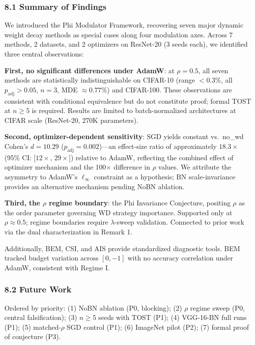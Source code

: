 \documentclass[
]{article}
\begin{document}
\hypertarget{summary-of-findings}{%
\subsubsection{8.1 Summary of Findings}\label{summary-of-findings}}

We introduced the Phi Modulator Framework, recovering seven major
dynamic weight decay methods as special cases along four modulation
axes. Across 7 methods, 2 datasets, and 2 optimizers on ResNet-20 (3
seeds each), we identified three central observations:

\textbf{First, no significant differences under AdamW}: at
\(\rho = 0.5\), all seven methods are statistically indistinguishable on
CIFAR-10 (range \(< 0.3\%\), all \(p_{\text{adj}} > 0.05\), \(n = 3\),
MDE \(\approx 0.77\%\)) and CIFAR-100. These observations are consistent
with conditional equivalence but do not constitute proof; formal TOST at
\(n \geq 5\) is required. Results are limited to batch-normalized
architectures at CIFAR scale (ResNet-20, 270K parameters).

\textbf{Second, optimizer-dependent sensitivity}: SGD yields constant
vs.~no\_wd Cohen's \(d = 10.29\) (\(p_{\text{adj}} = 0.002\))---an
effect-size ratio of approximately \(18.3\times\) (95\% CI:
{[}\(12\times\), \(29\times\){]}) relative to AdamW, reflecting the
combined effect of optimizer mechanism and the 100\(\times\) difference
in \(\rho\) values. We attribute the asymmetry to AdamW's
\(\ell_\infty\) constraint as a hypothesis; BN scale-invariance provides
an alternative mechanism pending NoBN ablation.

\textbf{Third, the \(\rho\) regime boundary}: the Phi Invariance
Conjecture, positing \(\rho\) as the order parameter governing WD
strategy importance. Supported only at \(\rho \approx 0.5\); regime
boundaries require \(\lambda\)-sweep validation. Connected to prior work
via the dual characterization in Remark 1.

Additionally, BEM, CSI, and AIS provide standardized diagnostic tools.
BEM tracked budget variation across \([0, -1]\) with no accuracy
correlation under AdamW, consistent with Regime I.

\hypertarget{future-work}{%
\subsubsection{8.2 Future Work}\label{future-work}}

Ordered by priority: (1) NoBN ablation (P0, blocking); (2) \(\rho\)
regime sweep (P0, central falsification); (3) \(n \geq 5\) seeds with
TOST (P1); (4) VGG-16-BN full runs (P1); (5) matched-\(\rho\) SGD
control (P1); (6) ImageNet pilot (P2); (7) formal proof of conjecture
(P3).
\end{document}
